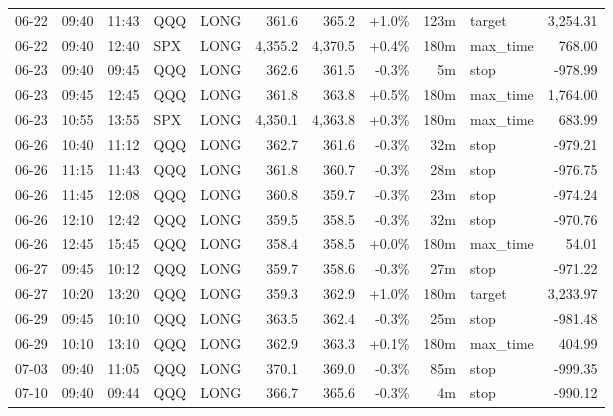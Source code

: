 \documentclass[11pt,a4paper,twoside]{article}
\begin{document}
\begin{center}
\begin{longtable}{>{\color{txtmain}}l l l l l r r r r >{\color{txtmain}}l r}
06-22 & 09:40 & 11:43 & QQQ & LONG & 361.6 & 365.2 & \textcolor{wingreen}{+1.0\%} & 123m & target & \textcolor{wingreen}{3,254.31} \\
06-22 & 09:40 & 12:40 & SPX & LONG & 4,355.2 & 4,370.5 & \textcolor{wingreen}{+0.4\%} & 180m & max\_time & \textcolor{wingreen}{768.00} \\
06-23 & 09:40 & 09:45 & QQQ & LONG & 362.6 & 361.5 & \textcolor{lossred}{-0.3\%} & 5m & stop & \textcolor{lossred}{-978.99} \\
06-23 & 09:45 & 12:45 & QQQ & LONG & 361.8 & 363.8 & \textcolor{wingreen}{+0.5\%} & 180m & max\_time & \textcolor{wingreen}{1,764.00} \\
06-23 & 10:55 & 13:55 & SPX & LONG & 4,350.1 & 4,363.8 & \textcolor{wingreen}{+0.3\%} & 180m & max\_time & \textcolor{wingreen}{683.99} \\
06-26 & 10:40 & 11:12 & QQQ & LONG & 362.7 & 361.6 & \textcolor{lossred}{-0.3\%} & 32m & stop & \textcolor{lossred}{-979.21} \\
06-26 & 11:15 & 11:43 & QQQ & LONG & 361.8 & 360.7 & \textcolor{lossred}{-0.3\%} & 28m & stop & \textcolor{lossred}{-976.75} \\
06-26 & 11:45 & 12:08 & QQQ & LONG & 360.8 & 359.7 & \textcolor{lossred}{-0.3\%} & 23m & stop & \textcolor{lossred}{-974.24} \\
06-26 & 12:10 & 12:42 & QQQ & LONG & 359.5 & 358.5 & \textcolor{lossred}{-0.3\%} & 32m & stop & \textcolor{lossred}{-970.76} \\
06-26 & 12:45 & 15:45 & QQQ & LONG & 358.4 & 358.5 & \textcolor{wingreen}{+0.0\%} & 180m & max\_time & \textcolor{wingreen}{54.01} \\
06-27 & 09:45 & 10:12 & QQQ & LONG & 359.7 & 358.6 & \textcolor{lossred}{-0.3\%} & 27m & stop & \textcolor{lossred}{-971.22} \\
06-27 & 10:20 & 13:20 & QQQ & LONG & 359.3 & 362.9 & \textcolor{wingreen}{+1.0\%} & 180m & target & \textcolor{wingreen}{3,233.97} \\
06-29 & 09:45 & 10:10 & QQQ & LONG & 363.5 & 362.4 & \textcolor{lossred}{-0.3\%} & 25m & stop & \textcolor{lossred}{-981.48} \\
06-29 & 10:10 & 13:10 & QQQ & LONG & 362.9 & 363.3 & \textcolor{wingreen}{+0.1\%} & 180m & max\_time & \textcolor{wingreen}{404.99} \\
07-03 & 09:40 & 11:05 & QQQ & LONG & 370.1 & 369.0 & \textcolor{lossred}{-0.3\%} & 85m & stop & \textcolor{lossred}{-999.35} \\
07-10 & 09:40 & 09:44 & QQQ & LONG & 366.7 & 365.6 & \textcolor{lossred}{-0.3\%} & 4m & stop & \textcolor{lossred}{-990.12} \\

\end{longtable}
\end{center}
\end{document}
